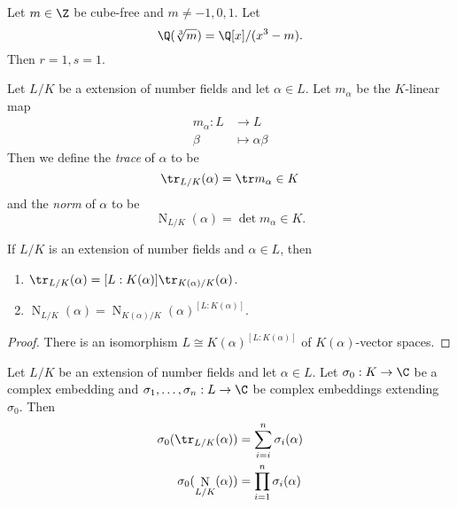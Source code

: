 \documentclass[a4paper]{article}
\DeclareMathOperator{\n}{N}
\begin{document}
\begin{eg}
  Let \(m \in \Z\) be cube-free and \(m \neq -1, 0, 1\). Let
  \[
    \Q(\sqrt[3]{m}) = \Q[x]/(x^3 - m).
  \]
  Then \(r = 1, s = 1\).
\end{eg}

\begin{definition}
  Let \(L/K\) be a extension of number fields and let \(\alpha \in L\). Let \(m_\alpha\) be the \(K\)-linear map
  \begin{align*}
    m_\alpha: L &\to L \\
    \beta &\mapsto \alpha\beta
  \end{align*}
  Then we define the \emph{trace} of \(\alpha\) to be
  \[
    \tr_{L/K}(\alpha) = \tr m_\alpha \in K
  \]
  and the \emph{norm} of \(\alpha\) to be
  \[
    \n_{L/K}(\alpha) = \det m_\alpha \in K.
  \]
\end{definition}

\begin{lemma}
  If \(L/K\) is an extension of number fields and \(\alpha \in L\), then
  \begin{enumerate}
  \item \(\tr_{L/K}(\alpha) = [L:K(\alpha)] \tr_{K(\alpha)/K}(\alpha)\).
  \item \(\n_{L/K}(\alpha) = \n_{K(\alpha)/K}(\alpha)^{[L:K(\alpha)]}\).
  \end{enumerate}
\end{lemma}

\begin{proof}
  There is an isomorphism \(L \cong K(\alpha)^{[L:K(\alpha)]}\) of \(K(\alpha)\)-vector spaces.
\end{proof}

\begin{lemma}
  Let \(L/K\) be an extension of number fields and let \(\alpha \in L\). Let \(\sigma_0: K \to \C\) be a complex embedding and \(\sigma_1, \dots, \sigma_n: L \to \C\) be complex embeddings extending \(\sigma_0\). Then
  \begin{align*}
    \sigma_0(\tr_{L/K}(\alpha)) &= \sum_{i = i}^n \sigma_i(\alpha) \\
    \sigma_0(\n_{L/K}(\alpha)) &= \prod_{i = 1}^n \sigma_i(\alpha)
  \end{align*}
\end{lemma}
\end{document}
